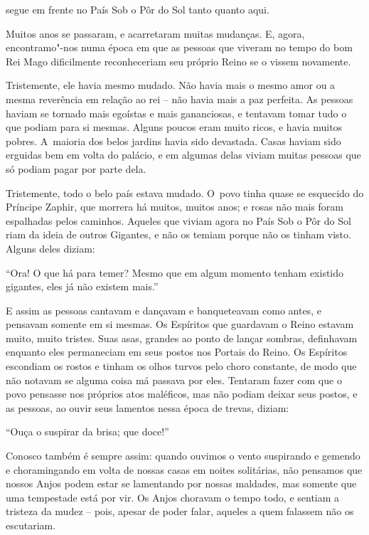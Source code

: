  

 segue em frente no País Sob o Pôr do Sol tanto quanto aqui.

\qquad Muitos anos se passaram, e acarretaram muitas mudanças. E, agora,
encontramo"-nos numa época em que as pessoas que viveram no tempo do bom
Rei Mago dificilmente reconheceriam seu próprio Reino se o vissem
novamente.

Tristemente, ele havia mesmo mudado. Não havia mais o mesmo amor ou a
mesma reverência em relação ao rei -- não havia mais a paz perfeita. As
pessoas haviam se tornado mais egoístas e mais gananciosas, e tentavam
tomar tudo o que podiam para si mesmas. Alguns poucos eram muito ricos,
e havia muitos pobres. A~maioria dos belos jardins havia sido devastada.
Casas haviam sido erguidas bem em volta do palácio, e em algumas delas
viviam muitas pessoas que só podiam pagar por parte dela.

Tristemente, todo o belo país estava mudado. O~povo tinha quase se
esquecido do Príncipe Zaphir, que morrera há muitos, muitos anos; e
rosas não mais foram espalhadas pelos caminhos. Aqueles que viviam agora
no País Sob o Pôr do Sol riam da ideia de outros Gigantes, e não os
temiam porque não os tinham visto. Alguns deles diziam:

``Ora! O que há para temer? Mesmo que em algum momento tenham existido
gigantes, eles já não existem mais.''

E assim as pessoas cantavam e dançavam e banqueteavam como antes, e
pensavam somente em si mesmas. Os Espíritos que guardavam o Reino
estavam muito, muito tristes. Suas asas, grandes ao ponto de lançar
sombras, definhavam enquanto eles permaneciam em seus postos nos Portais
do Reino. Os Espíritos escondiam os rostos e tinham os olhos turvos pelo
choro constante, de modo que não notavam se alguma coisa má passava
por eles. Tentaram fazer com que o povo pensasse nos próprios atos
maléficos, mas não podiam deixar seus postos, e as pessoas, ao ouvir
seus lamentos nessa época de trevas, diziam:

``Ouça o suspirar da brisa; que doce!''

Conosco também é sempre assim: quando ouvimos o vento suspirando e
gemendo e choramingando em volta de nossas casas em noites solitárias,
não pensamos que nossos Anjos podem estar se lamentando por nossas
maldades, mas somente que uma tempestade está por vir. Os Anjos choravam
o tempo todo, e sentiam a tristeza da mudez -- pois, apesar de poder
falar, aqueles a quem falassem não os escutariam.


